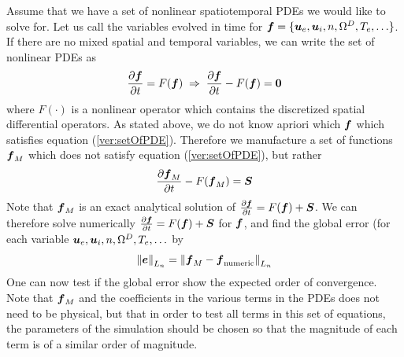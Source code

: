 Assume that we have a set of nonlinear spatiotemporal PDEs we would like to
solve for. Let us call the variables evolved in time for
$\boldsymbol{f}=\{\boldsymbol{u}_e, \boldsymbol{u}_i, n, \Omega^D, T_e, \ldots\}$. If there are no mixed
spatial and temporal variables, we can write the set of nonlinear PDEs as
%
\begin{align}
  \frac{\partial {\boldsymbol{f}}}{\partial{t}} = F(\boldsymbol{f}) \; \Rightarrow \; \frac{\partial {\boldsymbol{f}}}{\partial{t}} - F(\boldsymbol{f}) = \boldsymbol{0}
  \label{ver:setOfPDE}
\end{align}
%
where $F(\cdot)$ is a nonlinear operator which contains the discretized spatial
differential operators. As stated above, we do not know apriori which $\boldsymbol{f}$
which satisfies equation (\ref{ver:setOfPDE}). Therefore we manufacture a
set of functions $\boldsymbol{f}_M$ which does not satisfy equation
(\ref{ver:setOfPDE}), but rather
%
\begin{align*}
    \frac{\partial {\boldsymbol{f}_M}}{\partial{t}} - F(\boldsymbol{f}_M) = \boldsymbol{S}
\end{align*}
%
Note that $\boldsymbol{f}_M$ is an exact analytical solution of $\frac{\partial {\boldsymbol{f}}}{\partial{t}} =
F(\boldsymbol{f}) + \boldsymbol{S}$. We can therefore solve numerically $\frac{\partial {\boldsymbol{f}}}{\partial{t}} =
F(\boldsymbol{f}) + \boldsymbol{S}$ for $\boldsymbol{f}$, and find the global error (for each variable
$\boldsymbol{u}_e, \boldsymbol{u}_i, n, \Omega^D, T_e, \ldots$ by
%
\begin{align*}
    \left\|\boldsymbol{e}\right\|_{L_n} =
    \left\|\boldsymbol{f}_{M} - \boldsymbol{f}_{\text{numeric}}\right\|_{L_n}
\end{align*}
%
One can now test if the global error show the expected order of convergence.
Note that $\boldsymbol{f}_M$ and the coefficients in the various terms in the PDEs does
not need to be physical, but that in order to test all terms in this set of
equations, the parameters of the simulation should be chosen so that the
magnitude of each term is of a similar order of magnitude.


